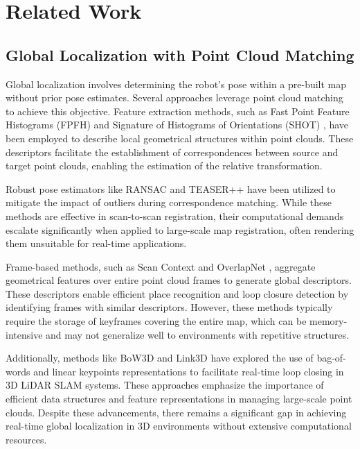 \section{Related Work}
\label{sec:literature_review}

\subsection{Global Localization with Point Cloud Matching}
Global localization involves determining the robot's pose within a pre-built map without prior pose estimates. Several approaches leverage point cloud matching to achieve this objective. Feature extraction methods, such as Fast Point Feature Histograms (FPFH) \cite{Rusu2009} and Signature of Histograms of Orientations (SHOT) \cite{Salti2014}, have been employed to describe local geometrical structures within point clouds. These descriptors facilitate the establishment of correspondences between source and target point clouds, enabling the estimation of the relative transformation.

Robust pose estimators like RANSAC \cite{10.1145/358669.358692} and TEASER++ \cite{yang2020teaserfastcertifiablepoint} have been utilized to mitigate the impact of outliers during correspondence matching. While these methods are effective in scan-to-scan registration, their computational demands escalate significantly when applied to large-scale map registration, often rendering them unsuitable for real-time applications.

Frame-based methods, such as Scan Context \cite{Kim2018} and OverlapNet \cite{Chen2021}, aggregate geometrical features over entire point cloud frames to generate global descriptors. These descriptors enable efficient place recognition and loop closure detection by identifying frames with similar descriptors. However, these methods typically require the storage of keyframes covering the entire map, which can be memory-intensive and may not generalize well to environments with repetitive structures.

Additionally, methods like BoW3D \cite{Cui2023} and Link3D \cite{Cui2022} have explored the use of bag-of-words and linear keypoints representations to facilitate real-time loop closing in 3D LiDAR SLAM systems. These approaches emphasize the importance of efficient data structures and feature representations in managing large-scale point clouds. Despite these advancements, there remains a significant gap in achieving real-time global localization in 3D environments without extensive computational resources.

